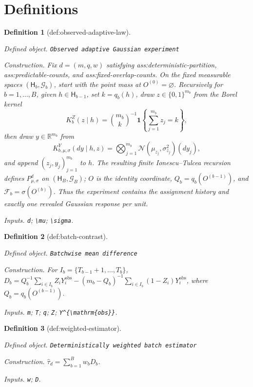 \documentclass{article}
\newtheorem{definition}{Definition}
\begin{document}
\section{Definitions}

\begin{definition}[def:observed-adaptive-law]\label{def:observed-adaptive-law}
\par\smallskip\noindent\emph{Defined object.} \texttt{Observed adaptive Gaussian experiment}
\par\smallskip\noindent\emph{Construction.} Fix \(d=(m,q,w)\) satisfying ass:deterministic-partition, ass:predictable-counts, and ass:fixed-overlap-counts. On the fixed measurable spaces \((\mathsf H_b,\mathcal G_b)\), start with the point mass at \(O^{(0)}=\varnothing\). Recursively for \(b=1,\ldots,B\), given \(h\in\mathsf H_{b-1}\), set \(k=q_b(h)\), draw \(z\in\{0,1\}^{m_b}\) from the Borel kernel \[K_b^Z(z\mid h)=\binom{m_b}{k}^{-1}\mathbf 1\!\left\{\sum_{j=1}^{m_b}z_j=k\right\},\] then draw \(y\in\mathbb R^{m_b}\) from \[K_{b,\mu,\sigma}^Y(dy\mid h,z)=\bigotimes_{j=1}^{m_b}\mathcal N(\mu_{z_j},\sigma_{z_j}^2)(dy_j),\] and append \((z_j,y_j)_{j=1}^{m_b}\) to \(h\). The resulting finite Ionescu--Tulcea recursion defines \(P^{d}_{\mu,\sigma}\) on \((\mathsf H_B,\mathcal G_B)\); \(O\) is the identity coordinate, \(Q_b=q_b(O^{(b-1)})\), and \(\mathcal F_b=\sigma(O^{(b)})\). Thus the experiment contains the assignment history and exactly one revealed Gaussian response per unit.
\par\smallskip\noindent\emph{Inputs.} \texttt{d}; \texttt{\textbackslash{}\allowbreak{}mu}; \texttt{\textbackslash{}\allowbreak{}sigma}.
\end{definition}

\begin{definition}[def:batch-contrast]\label{def:batch-contrast}
\par\smallskip\noindent\emph{Defined object.} \texttt{Batchwise mean difference}
\par\smallskip\noindent\emph{Construction.} For \(I_b=\{T_{b-1}+1,\ldots,T_b\}\), \(D_b=Q_b^{-1}\sum_{i\in I_b}Z_iY_i^{\mathrm{obs}}-(m_b-Q_b)^{-1}\sum_{i\in I_b}(1-Z_i)Y_i^{\mathrm{obs}}\), where \(Q_b=q_b(O^{(b-1)})\).
\par\smallskip\noindent\emph{Inputs.} \texttt{m}; \texttt{T}; \texttt{q}; \texttt{Z}; \texttt{Y\textasciicircum{}\{\textbackslash{}\allowbreak{}mathrm\{obs\}\allowbreak{}\}\allowbreak{}}.
\end{definition}

\begin{definition}[def:weighted-estimator]\label{def:weighted-estimator}
\par\smallskip\noindent\emph{Defined object.} \texttt{Deterministically weighted batch estimator}
\par\smallskip\noindent\emph{Construction.} \(\widehat\tau_d=\sum_{b=1}^B w_bD_b\).
\par\smallskip\noindent\emph{Inputs.} \texttt{w}; \texttt{D}.
\end{definition}
\end{document}
